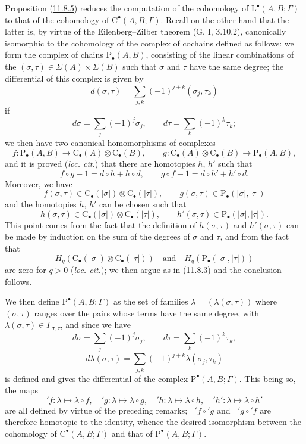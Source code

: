 \begin{env}[11.8.6]
\label{0.11.8.6}
Proposition (\hyperref[0.11.8.5]{11.8.5}) reduces the computation of the
cohomology of $\mathrm L^\bullet(A,B;\Gamma)$ to that of the cohomology of
$\mathrm C^\bullet(A,B;\Gamma)$. Recall on the other hand that the latter
is, by virtue of the Eilenberg--Zilber theorem (G, I, 3.10.2), canonically
isomorphic to the cohomology of the complex of cochains defined as follows:
we form the complex of chains $\mathrm P_\bullet(A,B)$, consisting of the
linear combinations of the $(\sigma,\tau)\in\Sigma(A)\times\Sigma(B)$ such
that $\sigma$ and $\tau$ have the same degree; the differential of this
complex is given by
\[
d(\sigma,\tau)=\sum_{j,k}(-1)^{j+k}(\sigma_j,\tau_k)
\]
if
\[
d\sigma=\sum_j(-1)^j\sigma_j,\qquad
d\tau=\sum_k(-1)^k\tau_k;
\]
we then have two canonical homomorphisms of complexes
\[
f:\mathrm P_\bullet(A,B)\longrightarrow
\mathrm C_\bullet(A)\otimes\mathrm C_\bullet(B),\qquad
g:\mathrm C_\bullet(A)\otimes\mathrm C_\bullet(B)
\longrightarrow\mathrm P_\bullet(A,B),
\]
and it is proved (\emph{loc. cit.}) that there are homotopies $h$, $h'$ such
that
\[
f\circ g-1=d\circ h+h\circ d,\qquad
g\circ f-1=d\circ h'+h'\circ d.
\]
Moreover, we have
\[
f(\sigma,\tau)\in\mathrm C_\bullet(|\sigma|)
\otimes\mathrm C_\bullet(|\tau|),\qquad
g(\sigma,\tau)\in\mathrm P_\bullet(|\sigma|,|\tau|)
\]
and the homotopies $h$, $h'$ can be chosen such that
\[
h(\sigma,\tau)\in\mathrm C_\bullet(|\sigma|)
\otimes\mathrm C_\bullet(|\tau|),\qquad
h'(\sigma,\tau)\in\mathrm P_\bullet(|\sigma|,|\tau|).
\]
This point comes from the fact that the definition of $h(\sigma,\tau)$ and
$h'(\sigma,\tau)$ can be made by induction on the sum of the degrees of
$\sigma$ and $\tau$, and from the fact that
\[
H_q(\mathrm C_\bullet(|\sigma|)\otimes\mathrm C_\bullet(|\tau|))
\quad\text{and}\quad
H_q(\mathrm P_\bullet(|\sigma|,|\tau|))
\]
are zero for $q>0$ (\emph{loc. cit.}); we then argue as in
(\hyperref[0.11.8.3]{11.8.3}) and the conclusion follows.

We then define $\mathrm P^\bullet(A,B;\Gamma)$ as the set of
families $\lambda=(\lambda(\sigma,\tau))$ where $(\sigma,\tau)$ ranges over
the pairs whose terms have the same degree, with
$\lambda(\sigma,\tau)\in\Gamma_{\sigma,\tau}$, and since we have
\[
d\sigma=\sum_j(-1)^j\sigma_j,\qquad
d\tau=\sum_k(-1)^k\tau_k,
\]
\[
d\lambda(\sigma,\tau)=
\sum_{j,k}(-1)^{j+k}\lambda(\sigma_j,\tau_k)
\]
is defined and gives the differential of the complex
$\mathrm P^\bullet(A,B;\Gamma)$. This being so, the maps
\[
{}'f:\lambda\mapsto\lambda\circ f,\quad
{}'g:\lambda\mapsto\lambda\circ g,\quad
{}'h:\lambda\mapsto\lambda\circ h,\quad
{}'h':\lambda\mapsto\lambda\circ h'
\]
are all defined by virtue of the preceding remarks;
$\mathop{}'f\circ{}'g$ and $\mathop{}'g\circ{}'f$ are therefore homotopic to
the identity, whence the desired isomorphism between the cohomology of
$\mathrm C^\bullet(A,B;\Gamma)$ and that of
$\mathrm P^\bullet(A,B;\Gamma)$.
\end{env}

